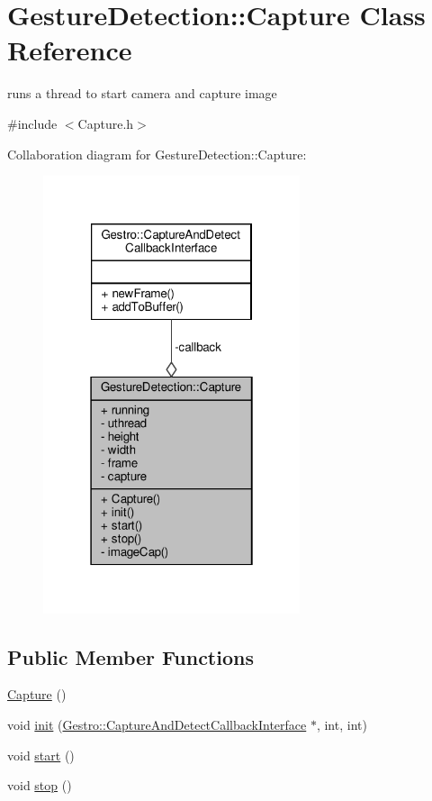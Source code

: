\hypertarget{class_gesture_detection_1_1_capture}{}\section{Gesture\+Detection\+:\+:Capture Class Reference}
\label{class_gesture_detection_1_1_capture}


runs a thread to start camera and capture image  




{\ttfamily \#include $<$Capture.\+h$>$}



Collaboration diagram for Gesture\+Detection\+:\+:Capture\+:
\nopagebreak
\begin{figure}[H]
\begin{center}
\leavevmode
\includegraphics[width=214pt]{class_gesture_detection_1_1_capture__coll__graph}
\end{center}
\end{figure}
\subsection*{Public Member Functions}
\begin{DoxyCompactItemize}
\item 
\hyperlink{class_gesture_detection_1_1_capture_a97036b5d271238bd4852da79a0091b57}{Capture} ()
\item 
void \hyperlink{class_gesture_detection_1_1_capture_aaff420636b6bac6593789344cc990580}{init} (\hyperlink{class_gestro_1_1_capture_and_detect_callback_interface}{Gestro\+::\+Capture\+And\+Detect\+Callback\+Interface} $\ast$, int, int)
\item 
void \hyperlink{class_gesture_detection_1_1_capture_a2ffe4eeac4caa296f4fcc75cc82c1436}{start} ()
\item 
void \hyperlink{class_gesture_detection_1_1_capture_ab632f1927461a909b18cce71ec96f76d}{stop} ()
\end{DoxyCompactItemize}
